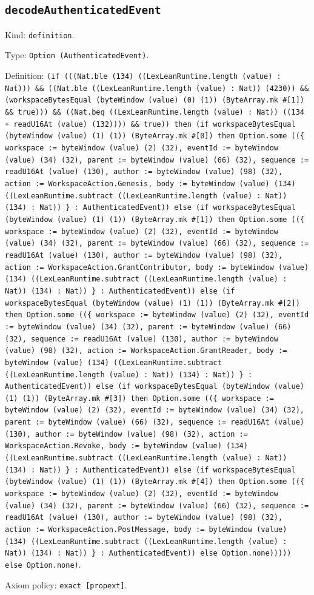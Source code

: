 \documentclass[11pt]{article}
\begin{document}
\subsection*{\texttt{decodeAuthenticatedEvent}}
\noindent Kind: \texttt{definition}.\par
\noindent Type: \texttt{Option (AuthenticatedEvent)}.\par
\noindent Definition: \texttt{(if (((Nat.ble (134) ((LexLeanRuntime.length (value) : Nat))) \&\& ((Nat.ble ((LexLeanRuntime.length (value) : Nat)) (4230)) \&\& (workspaceBytesEqual (byteWindow (value) (0) (1)) (ByteArray.mk \#[1]) \&\& true))) \&\& ((Nat.beq ((LexLeanRuntime.length (value) : Nat)) ((134 + readU16At (value) (132)))) \&\& true)) then (if workspaceBytesEqual (byteWindow (value) (1) (1)) (ByteArray.mk \#[0]) then Option.some ((\{ workspace := byteWindow (value) (2) (32), eventId := byteWindow (value) (34) (32), parent := byteWindow (value) (66) (32), sequence := readU16At (value) (130), author := byteWindow (value) (98) (32), action := WorkspaceAction.Genesis, body := byteWindow (value) (134) ((LexLeanRuntime.subtract ((LexLeanRuntime.length (value) : Nat)) (134) : Nat)) \} : AuthenticatedEvent)) else (if workspaceBytesEqual (byteWindow (value) (1) (1)) (ByteArray.mk \#[1]) then Option.some ((\{ workspace := byteWindow (value) (2) (32), eventId := byteWindow (value) (34) (32), parent := byteWindow (value) (66) (32), sequence := readU16At (value) (130), author := byteWindow (value) (98) (32), action := WorkspaceAction.GrantContributor, body := byteWindow (value) (134) ((LexLeanRuntime.subtract ((LexLeanRuntime.length (value) : Nat)) (134) : Nat)) \} : AuthenticatedEvent)) else (if workspaceBytesEqual (byteWindow (value) (1) (1)) (ByteArray.mk \#[2]) then Option.some ((\{ workspace := byteWindow (value) (2) (32), eventId := byteWindow (value) (34) (32), parent := byteWindow (value) (66) (32), sequence := readU16At (value) (130), author := byteWindow (value) (98) (32), action := WorkspaceAction.GrantReader, body := byteWindow (value) (134) ((LexLeanRuntime.subtract ((LexLeanRuntime.length (value) : Nat)) (134) : Nat)) \} : AuthenticatedEvent)) else (if workspaceBytesEqual (byteWindow (value) (1) (1)) (ByteArray.mk \#[3]) then Option.some ((\{ workspace := byteWindow (value) (2) (32), eventId := byteWindow (value) (34) (32), parent := byteWindow (value) (66) (32), sequence := readU16At (value) (130), author := byteWindow (value) (98) (32), action := WorkspaceAction.Revoke, body := byteWindow (value) (134) ((LexLeanRuntime.subtract ((LexLeanRuntime.length (value) : Nat)) (134) : Nat)) \} : AuthenticatedEvent)) else (if workspaceBytesEqual (byteWindow (value) (1) (1)) (ByteArray.mk \#[4]) then Option.some ((\{ workspace := byteWindow (value) (2) (32), eventId := byteWindow (value) (34) (32), parent := byteWindow (value) (66) (32), sequence := readU16At (value) (130), author := byteWindow (value) (98) (32), action := WorkspaceAction.PostMessage, body := byteWindow (value) (134) ((LexLeanRuntime.subtract ((LexLeanRuntime.length (value) : Nat)) (134) : Nat)) \} : AuthenticatedEvent)) else Option.none))))) else Option.none)}.\par
\noindent Axiom policy: \texttt{exact [propext]}.\par
\end{document}
